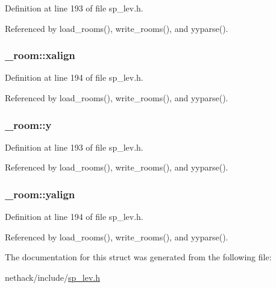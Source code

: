 Definition at line 193 of file sp\+\_\+lev.\+h.



Referenced by load\+\_\+rooms(), write\+\_\+rooms(), and yyparse().

\hypertarget{struct__room_a18538541f582181a368b543e6d36a4d2}{
\subsubsection[{xalign}]{ \+\_\+room\+::xalign}}\label{struct__room_a18538541f582181a368b543e6d36a4d2}


Definition at line 194 of file sp\+\_\+lev.\+h.



Referenced by load\+\_\+rooms(), write\+\_\+rooms(), and yyparse().

\hypertarget{struct__room_a62bdbccfce4dd3dcd1af7d5bf1d36041}{
\subsubsection[{y}]{ \+\_\+room\+::y}}\label{struct__room_a62bdbccfce4dd3dcd1af7d5bf1d36041}


Definition at line 193 of file sp\+\_\+lev.\+h.



Referenced by load\+\_\+rooms(), write\+\_\+rooms(), and yyparse().

\hypertarget{struct__room_a521977071dfc4981b7f294dfdf59cf6d}{
\subsubsection[{yalign}]{ \+\_\+room\+::yalign}}\label{struct__room_a521977071dfc4981b7f294dfdf59cf6d}


Definition at line 194 of file sp\+\_\+lev.\+h.



Referenced by load\+\_\+rooms(), write\+\_\+rooms(), and yyparse().



The documentation for this struct was generated from the following file\+:\begin{DoxyCompactItemize}
\item 
nethack/include/\hyperlink{sp__lev_8h}{sp\+\_\+lev.\+h}\end{DoxyCompactItemize}
